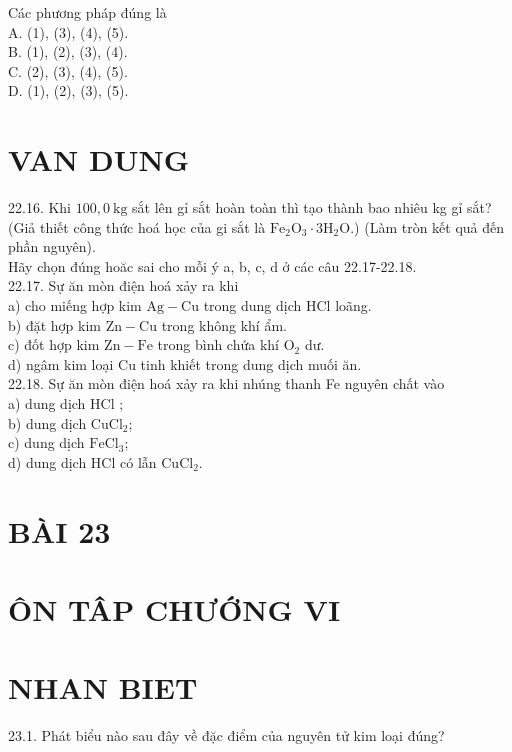 \documentclass[10pt]{article}
\begin{document}
Các phương pháp đúng là\\
A. (1), (3), (4), (5).\\
B. (1), (2), (3), (4).\\
C. (2), (3), (4), (5).\\
D. (1), (2), (3), (5).

\section*{VAN DUNG}
22.16. Khi $100,0 \mathrm{~kg}$ sắt lên gỉ sắt hoàn toàn thì tạo thành bao nhiêu kg gỉ sắt? (Giả thiết công thức hoá học của gi sắt là $\mathrm{Fe}_{2} \mathrm{O}_{3} \cdot 3 \mathrm{H}_{2} \mathrm{O}$.) (Làm tròn kết quả đến phần nguyên).\\
Hãy chọn đúng hoăc sai cho mỗi ý a, b, c, d ở các câu 22.17-22.18.\\
22.17. Sự ăn mòn điện hoá xảy ra khi\\
a) cho miếng hợp kim $\mathrm{Ag}-\mathrm{Cu}$ trong dung dịch HCl loãng.\\
b) đặt hợp kim $\mathrm{Zn}-\mathrm{Cu}$ trong không khí ẩm.\\
c) đốt hợp kim $\mathrm{Zn}-\mathrm{Fe}$ trong bình chứa khí $\mathrm{O}_{2}$ dư.\\
d) ngâm kim loại Cu tinh khiết trong dung dịch muối ăn.\\
22.18. Sự ăn mòn điện hoá xảy ra khi nhúng thanh Fe nguyên chất vào\\
a) dung dịch HCl ;\\
b) dung dịch $\mathrm{CuCl}_{2}$;\\
c) dung dịch $\mathrm{FeCl}_{3}$;\\
d) dung dịch HCl có lẫn $\mathrm{CuCl}_{2}$.

\section*{BÀI 23}
\section*{ÔN TÂP CHƯỚNG VI}
\section*{NHAN BIET}
23.1. Phát biểu nào sau đây về đặc điểm của nguyên tử kim loại đúng?
\end{document}
